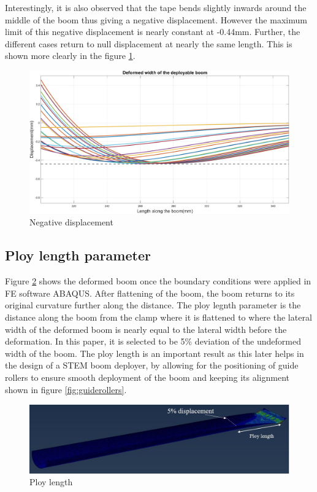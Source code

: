 Interestingly, it is also observed that the tape bends slightly inwards around the middle of the boom thus giving a negative displacement. However the maximum limit of this negative displacement is nearly constant at -0.44mm. Further, the different cases return to null displacement at nearly the same length. This is shown more clearly in the figure \ref{fig:negdisp}.   

\begin{figure}[!hbt]
    \centering
    \includegraphics[width=15cm]{images/zoomin.jpg}
    \caption{Negative displacement}
    \label{fig:negdisp}
\end{figure}
\subsection{Ploy length parameter}
Figure \ref{fig:ploydefine} shows the deformed boom once the boundary conditions were applied in FE software ABAQUS. After flattening of the boom, the boom returns to its original curvature further along the distance. The ploy legnth parameter is the distance along the boom from the clamp where it is flattened to where the lateral width of the deformed boom is nearly equal to the lateral width before the deformation. In this paper, it is selected to be 5\% deviation of the undeformed width of the boom. The ploy length is an important result as this later helps in the design of a STEM boom deployer, by allowing for the positioning of guide rollers to ensure smooth deployment of the boom and keeping its alignment shown in figure \ref{fig:guiderollers}. 
\begin{figure}[!hbt]
    \centering
    \includegraphics[width=15cm]{images/pic1.JPG}
    \caption{Ploy length}
    \label{fig:ploydefine}
\end{figure}

